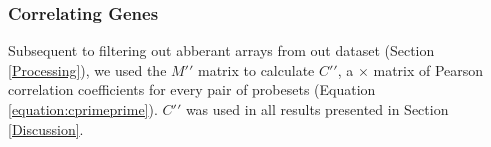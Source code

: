\documentclass{bioinfo}
\begin{document}
\begin{methods}
%
%


\subsubsection{Correlating Genes}\label{Correlation}

Subsequent to filtering out abberant arrays from out dataset (Section
\ref{Processing}), we used the $M\prime\prime$ matrix to calculate
$C\prime\prime$, a  $\times$  matrix of Pearson
correlation coefficients for every pair of probesets (Equation
\ref{equation:cprimeprime}).  $C\prime\prime$ was used in all results presented
in Section \ref{Discussion}.


\end{methods}
\end{document}
